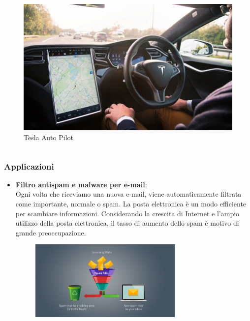 \begin{frame}
\begin{itemize}
\begin{columns}
					\begin{figure}[!htbp]
						\centering
						\includegraphics[angle=0,width=\linewidth]{images/intro/self_driving_car_tesla_autopilot.jpg}
						\caption{Tesla Auto Pilot}
					\end{figure}
							
				\end{columns}

		\end{itemize}		

\end{frame}

\begin{frame}
	\frametitle{Applicazioni}
		\begin{itemize}
			\item \textbf{Filtro antispam e malware per e-mail}:\\
				Ogni volta che riceviamo una nuova e-mail, viene automaticamente filtrata come importante, normale o spam. La posta elettronica è un modo efficiente per scambiare informazioni. Considerando la crescita di Internet e l'ampio utilizzo della posta elettronica, il tasso di aumento dello spam è motivo di grande preoccupazione.
				\begin{figure}[!htbp]
					\centering
					\includegraphics[width=7.5cm]{images/intro/anti-spam-filtering-techniques.jpg}
				\end{figure}
		\end{itemize}		
\end{frame}


